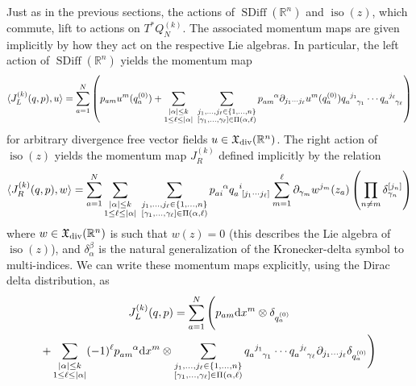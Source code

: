 \documentclass[12pt]{amsart}
\newcommand{\R}{\ensuremath{\mathbb{R}}}
\newcommand{\dx}{\ensuremath{\textrm{d}x}}
\DeclareMathOperator{\SDiff}{SDiff}
\DeclareMathOperator{\iso}{iso}
\begin{document}
  Just as in the previous sections, the actions of $\SDiff(\R^n)$ and $\iso(z)$, which commute, lift to actions on $T^*Q_N^{(k)}$.
  The associated momentum maps are given implicitly by how they act on the respective Lie algebras.
  In particular, the left action of $\SDiff(\R^n)$ yields the momentum map
  \begin{equation*}
  	\langle J_L^{(k)}(q,p) , u \rangle =
	\sum_{a=1}^N \left( p_{am} u^m(q^{(0)}_a) +
    \sum_{\substack{ |\alpha| \leq k \\ 1 \leq \ell \leq |\alpha| }} \;
		\sum_{
			\substack{
				j_1,\dots,j_\ell \in \{1,\dots,n\} \\
				[\gamma_1,\dots,\gamma_\ell] \in \Pi(\alpha,\ell)
				}
			}
			p\indices{_a_m^\alpha} \partial_{j_1 \cdots j_\ell}u^m (q^{(0)}_a)
      q\indices{_a^{j_1}_{\gamma_1}} \cdots
      q\indices{_a^{j_\ell}_{\gamma_\ell}}
			\right)
  \end{equation*}
  for arbitrary divergence free vector fields $u \in \mathfrak{X}_{\rm div}(\R^n)$.
  The right action of $\iso(z)$ yields the momentum map $J_R^{(k)}$ defined implicitly by the relation
  \begin{equation*}
    \langle J_R^{(k)}(q,p) , w \rangle = \sum_{a=1}^N
    \sum_{\substack{ |\alpha| \leq k \\ 1 \leq \ell \leq |\alpha| }} \;
		\sum_{
			\substack{
				j_1,\dots,j_\ell \in \{1,\dots,n\} \\
				[\gamma_1,\dots,\gamma_\ell] \in \Pi(\alpha,\ell)
				}
			}
			p\indices{_a_i^\alpha} q\indices{_a^{i}_{[j_1 \cdots j_\ell]}}
      \sum_{m=1}^\ell  \partial_{\gamma_m} w^{j_m}(z_a) \left( \prod_{n \neq m}  \delta_{\gamma_n}^{[j_n]} \right)
  \end{equation*}
  where $w \in \mathfrak{X}_{\rm div}(\R^n)$ is such that $w(z) = 0$ (this describes the Lie algebra of $\iso(z)$),
  and $\delta_\alpha^\beta$ is the natural generalization of the Kronecker-delta symbol to multi-indices.
  We can write these momentum maps explicitly, using the Dirac delta distribution, as
  \begin{multline}\label{eq:JLk}
    J_L^{(k)}(q,p) =
    \sum_{a=1}^N \Bigg(
    p_{am} \dx^m \otimes \delta_{q^{(0)}_a} \\
  + \sum_{\substack{ |\alpha| \leq k \\ 1 \leq \ell \leq |\alpha| }}
    (-1)^\ell p\indices{_{am}^\alpha} \dx^m \otimes
      \sum_{\substack{
          j_1,\dots,j_\ell \in \{1,\dots,n\} \\
          [\gamma_1,\dots,\gamma_\ell] \in \Pi( \alpha,\ell)
          }
        }
      q\indices{_a^{j_1}_{\gamma_1}} \cdots q\indices{_a^{j_\ell}_{\gamma_\ell}}
      \partial_{j_1 \cdots j_\ell} \delta_{q^{(0)}_a}
      \Bigg)
  \end{multline}
\end{document}
